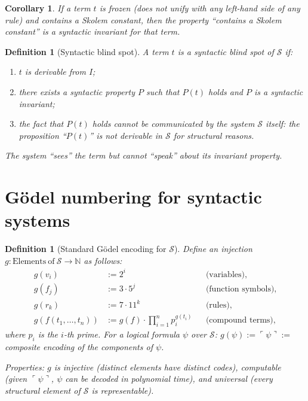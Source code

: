 \documentclass[11pt]{article}
\newtheorem{corollary}[theorem]{Corollary}
\newtheorem{definition}[theorem]{Definition}
\begin{document}
\begin{corollary}
If a term $t$ is frozen (does not unify with any left-hand side of any
rule) and contains a Skolem constant, then the property ``contains a
Skolem constant'' is a syntactic invariant for that term.
\end{corollary}

\begin{definition}[Syntactic blind spot]
\label{def:blind-spot}
A term $t$ is a \emph{syntactic blind spot} of $\mathcal{S}$ if:
\begin{enumerate}
  \item $t$ is derivable from $I$;
  \item there exists a syntactic property $P$ such that $P(t)$ holds and
        $P$ is a syntactic invariant;
  \item the fact that $P(t)$ holds cannot be communicated by the system
        $\mathcal{S}$ itself: the proposition ``$P(t)$'' is not derivable
        in $\mathcal{S}$ for structural reasons.
\end{enumerate}
The system ``sees'' the term but cannot ``speak'' about its invariant
property.
\end{definition}


\section{G\"odel numbering for syntactic systems}
\label{sec:godel}


\begin{definition}[Standard G\"odel encoding for $\mathcal{S}$]
\label{def:godel-encoding}
Define an injection
$g : \mathrm{Elements\ of\ } \mathcal{S} \to \mathbb{N}$ as follows:
\begin{align*}
  g(v_i) &:= 2^i && \text{(variables),} \\
  g(f_j) &:= 3 \cdot 5^j && \text{(function symbols),} \\
  g(r_k) &:= 7 \cdot 11^k && \text{(rules),} \\
  g(f(t_1, \ldots, t_n)) &:= g(f) \cdot \prod_{i=1}^{n} p_i^{g(t_i)}
    && \text{(compound terms),}
\end{align*}
where $p_i$ is the $i$-th prime. For a logical formula $\psi$ over
$\mathcal{S}$:
$g(\psi) := \ulcorner\psi\urcorner :=$ composite encoding of the
components of $\psi$.

Properties: $g$ is injective (distinct elements have distinct codes),
computable (given $\ulcorner\psi\urcorner$, $\psi$ can be decoded in
polynomial time), and universal (every structural element of
$\mathcal{S}$ is representable).
\end{definition}
\end{document}

